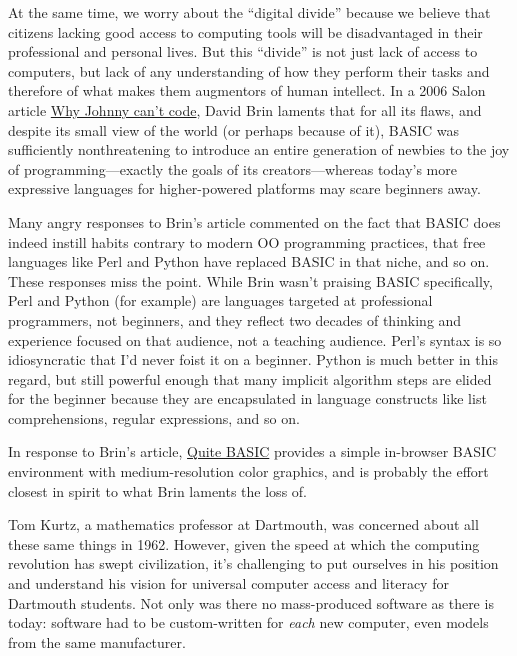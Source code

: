 \documentclass{article}
\begin{document}
At the same time, we worry about the ``digital divide''
because we believe that citizens lacking good access to
computing tools will be disadvantaged in their professional and personal
lives.  But this ``divide'' is not just lack of access to computers, but lack
of any understanding of how they perform their tasks and therefore of
what makes them augmentors of human intellect.
In a 2006 Salon article \href{www.salon.com/2006/09/14/basic_2}{Why Johnny
  can't code},
David Brin laments that for
all its flaws, and despite its small view of the world (or perhaps
because of it), BASIC was sufficiently
nonthreatening to introduce an entire generation of newbies
to the joy of programming---exactly
the goals of its creators---whereas today's more expressive languages
for higher-powered platforms may scare beginners away.

\begin{geeknote}
Many angry responses to Brin's article commented on the fact that BASIC
does indeed instill habits contrary to modern OO programming practices,
that free languages like Perl and Python have replaced BASIC in that
niche, and so on.  These responses miss the point.  While Brin wasn't
praising BASIC specifically, Perl and Python (for example) are languages
targeted at professional programmers, not beginners, and they
reflect two decades of thinking and experience focused on that audience,
not a teaching audience.  Perl's syntax is so idiosyncratic that I'd
never foist it on a beginner. Python is much better in this regard, but
still powerful enough that many implicit algorithm steps are elided for
the beginner because they are encapsulated in language constructs like
list comprehensions, regular expressions, and so on.

In response to Brin's article, 
\href{http://quitebasic.com}{Quite BASIC} provides a simple in-browser
BASIC environment with medium-resolution color graphics, and is probably
the effort closest in spirit to what Brin laments the loss of.

\end{geeknote}

Tom Kurtz, a mathematics professor at Dartmouth, was concerned about all
these same things in 1962.
However, given the speed at which the computing revolution has swept
civilization, it's challenging to put ourselves in his position and
understand his vision for universal computer access and literacy for
Dartmouth students.
Not only was there no mass-produced software as
there is today: software  had to be custom-written for \emph{each} new
computer, even models from the same manufacturer.  
\end{document}
